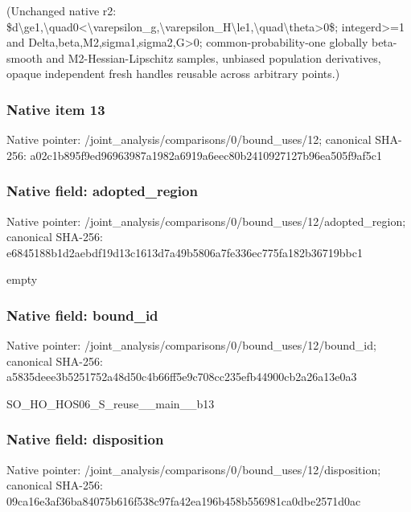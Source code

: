 \documentclass[10pt,a4paper]{article}
\begin{document}
\begingroup\raggedright\sloppy (Unchanged native r2:\allowbreak{} \$d\textbackslash{}ge1,\allowbreak{}\textbackslash{}quad0<\textbackslash{}varepsilon\_\allowbreak{}g,\allowbreak{}\textbackslash{}varepsilon\_\allowbreak{}H\textbackslash{}le1,\allowbreak{}\textbackslash{}quad\textbackslash{}theta>0\$;\allowbreak{} integerd>=\allowbreak{}1 and Delta,\allowbreak{}beta,\allowbreak{}M2,\allowbreak{}sigma1,\allowbreak{}sigma2,\allowbreak{}G>0;\allowbreak{} common-probability-one globally beta-smooth and M2-Hessian-Lipschitz samples,\allowbreak{} unbiased population derivatives,\allowbreak{} opaque independent fresh handles reusable across arbitrary points.)\par\endgroup

\subsubsection{Native item 13}
Native pointer: /joint\_\allowbreak{}analysis/comparisons/0/bound\_\allowbreak{}uses/12; canonical SHA-256: a02c1b895f9ed96963987a1982a6919a6eec80b2410927127b96ea505f9af5c1

\subsubsection{Native field: adopted\_\allowbreak{}region}
Native pointer: /joint\_\allowbreak{}analysis/comparisons/0/bound\_\allowbreak{}uses/12/adopted\_\allowbreak{}region; canonical SHA-256: e6845188b1d2aebdf19d13c1613d7a49b5806a7fe336ec775fa182b36719bbc1

\begingroup\raggedright\sloppy empty\par\endgroup

\subsubsection{Native field: bound\_\allowbreak{}id}
Native pointer: /joint\_\allowbreak{}analysis/comparisons/0/bound\_\allowbreak{}uses/12/bound\_\allowbreak{}id; canonical SHA-256: a5835deee3b5251752a48d50c4b66ff5e9c708cc235efb44900cb2a26a13e0a3

\begingroup\raggedright\sloppy SO\_\allowbreak{}HO\_\allowbreak{}HOS06\_\allowbreak{}S\_\allowbreak{}reuse\_\allowbreak{}\_\allowbreak{}main\_\allowbreak{}\_\allowbreak{}b13\par\endgroup

\subsubsection{Native field: disposition}
Native pointer: /joint\_\allowbreak{}analysis/comparisons/0/bound\_\allowbreak{}uses/12/disposition; canonical SHA-256: 09ca16e3af36ba84075b616f538c97fa42ea196b458b556981ca0dbe2571d0ac
\end{document}
